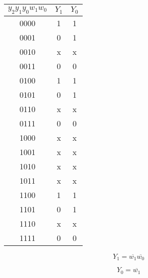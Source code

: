 \documentclass[10pt,a4paper]{article}
\begin{document}
\begin{multicols}{2}

\begin{tabular}{c|c|c}
$y_2y_1y_0w_1w_0$ & $Y_1$ & $Y_0$  \\ 
\hline 
0000 & 1 & 1  \\ 
\hline 
0001 & 0 & 1  \\ 
\hline 
0010 & x & x  \\ 
\hline 
0011 & 0 & 0  \\ 
\hline 
0100 & 1 & 1  \\ 
\hline 
0101 & 0 & 1  \\ 
\hline 
0110 & x & x  \\ 
\hline 
0111 & 0 & 0  \\ 
\hline 
1000 & x & x  \\ 
\hline 
1001 & x & x  \\ 
\hline 
1010 & x & x  \\ 
\hline 
1011 & x & x  \\ 
\hline 
1100 & 1 & 1  \\ 
\hline 
1101 & 0 & 1  \\ 
\hline 
1110 & x & x  \\ 
\hline 
1111 & 0 & 0  \\ 
\end{tabular} 

\[
Y_1 = \overline{w_1}\overline{w_0}
\]

\[
Y_0 = \overline{w_1}
\]
\end{multicols}
\end{document}
